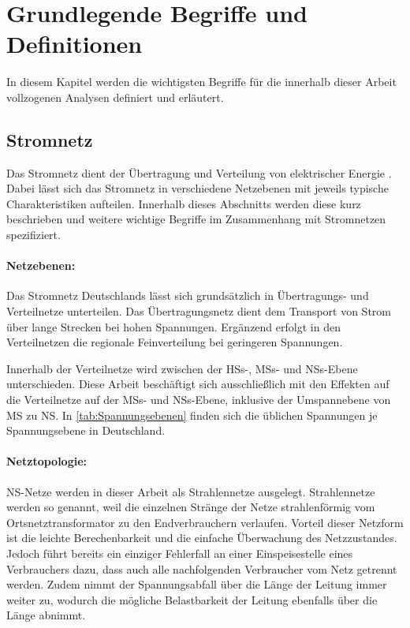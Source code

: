 \section{Grundlegende Begriffe und Definitionen}\label{chap:base_theo}

In diesem Kapitel werden die wichtigsten Begriffe für die innerhalb dieser Arbeit vollzogenen Analysen definiert und erläutert.


\subsection{Stromnetz}\label{chap:theo_grid}

Das Stromnetz dient der Übertragung und Verteilung von elektrischer Energie \cite{Paschotta2020}.
Dabei lässt sich das Stromnetz in verschiedene Netzebenen mit jeweils typische Charakteristiken aufteilen.
Innerhalb dieses Abschnitts werden diese kurz beschrieben und weitere wichtige Begriffe im Zusammenhang mit Stromnetzen spezifiziert.


\paragraph{Netzebenen:}

Das Stromnetz Deutschlands lässt sich grundsätzlich in Übertragungs- und Verteilnetze unterteilen.
Das Übertragungsnetz dient dem Transport von Strom über lange Strecken bei hohen Spannungen.
Ergänzend erfolgt in den Verteilnetzen die regionale Feinverteilung bei geringeren Spannungen. \cite{Agora2019}\medskip

Innerhalb der Verteilnetze wird zwischen der \glspl{HS}-, \glspl{MS}- und \glspl{NS}-Ebene unterschieden.
Diese Arbeit beschäftigt sich ausschließlich mit den Effekten auf die Verteilnetze auf der \glspl{MS}- und \glspl{NS}-Ebene, inklusive der Umspannebene von \gls{MS} zu \gls{NS}.
In \autoref{tab:Spannungsebenen} finden sich die üblichen Spannungen je Spannungsebene in Deutschland.




\paragraph{Netztopologie:}

\gls{NS}-Netze werden in dieser Arbeit als Strahlennetze ausgelegt.
Strahlennetze werden so genannt, weil die einzelnen Stränge der Netze strahlenförmig vom Ortsnetztransformator zu den Endverbrauchern verlaufen.
Vorteil dieser Netzform ist die leichte Berechenbarkeit und die einfache Überwachung des Netzzustandes.
Jedoch führt bereits ein einziger Fehlerfall an einer Einspeisestelle eines Verbrauchers dazu, dass auch alle nachfolgenden Verbraucher vom Netz getrennt werden.
Zudem nimmt der Spannungsabfall über die Länge der Leitung immer weiter zu, wodurch die mögliche Belastbarkeit der Leitung ebenfalls über die Länge abnimmt. \cite{Agora2019} \cite{WNG2020}\medskip

